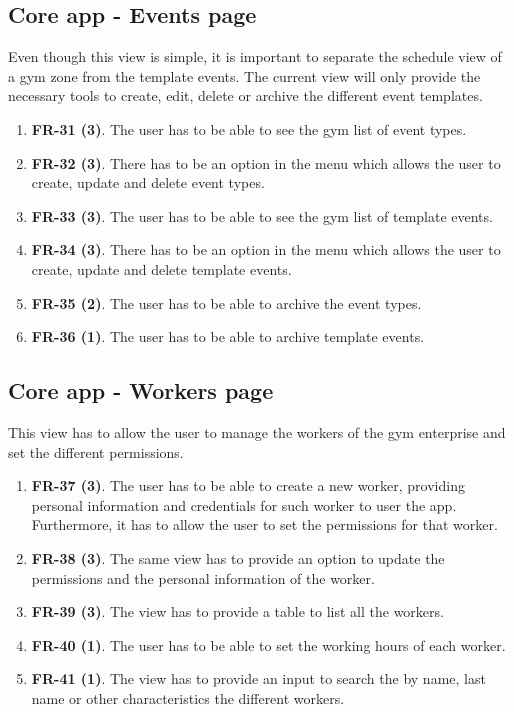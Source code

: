 \documentclass[a4paper, 12pt, oneside]{book}
\begin{document}
\subsection{Core app - Events page}
Even though this view is simple, it is important to separate the schedule view of a gym zone from the template events. The current view will only provide the necessary tools to create, edit, delete or archive the different event templates.
\begin{enumerate}[label = -]
	\item \textbf{FR-31 (3)}. The user has to be able to see the gym list of event types.
	\item \textbf{FR-32 (3)}. There has to be an option in the menu which allows the user to create, update and delete event types.
	\item \textbf{FR-33 (3)}. The user has to be able to see the gym list of template events.
	\item \textbf{FR-34 (3)}. There has to be an option in the menu which allows the user to create, update and delete template events.
	\item \textbf{FR-35 (2)}. The user has to be able to archive the event types.
	\item \textbf{FR-36 (1)}. The user has to be able to archive template events.
\end{enumerate}
\subsection{Core app - Workers page}
This view has to allow the user to manage the workers of the gym enterprise and set the different permissions.
\begin{enumerate}[label = -]
	\item \textbf{FR-37 (3)}. The user has to be able to create a new worker, providing personal information and credentials for such worker to user the app. Furthermore, it has to allow the user to set the permissions for that worker.
	\item \textbf{FR-38 (3)}. The same view has to provide an option to update the permissions and the personal information of the worker.
	\item \textbf{FR-39 (3)}. The view has to provide a table to list all the workers.
	\item \textbf{FR-40 (1)}. The user has to be able to set the working hours of each worker.
	\item \textbf{FR-41 (1)}. The view has to provide an input to search the by name, last name or other characteristics the different workers.
\end{enumerate}
\end{document}

